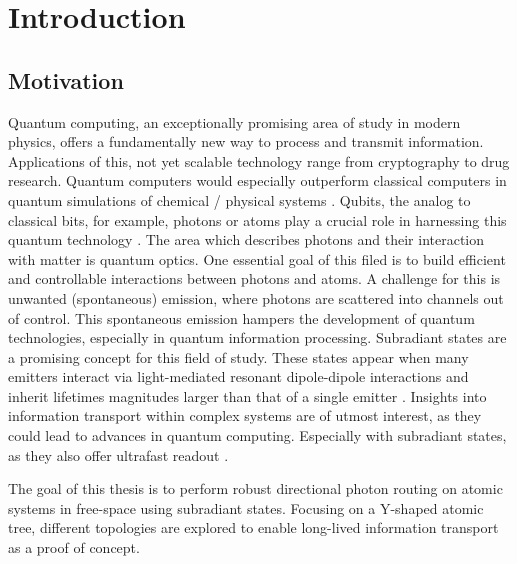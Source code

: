 \chapter{Introduction} %
\label{Chapter1} %

\section{Motivation}
\noindent
Quantum computing, an exceptionally promising area of study in modern physics, offers a fundamentally new way to process and transmit information.
Applications of this, not yet scalable technology range from cryptography to drug research.
Quantum computers would especially outperform classical computers in quantum simulations of chemical / physical systems \cite{Eddins2022}.
Qubits, the analog to classical bits, for example,
photons or atoms play a crucial role in harnessing this quantum technology \cite{Ramakrishnan2023}.
The area which describes photons and their interaction with matter is quantum optics.
One essential goal of this filed is to build efficient and controllable interactions between photons and atoms.
A challenge for this is unwanted (spontaneous) emission, where photons are scattered into channels out of control.
This spontaneous emission hampers the development of quantum technologies, especially in quantum information processing.
Subradiant states are a promising concept for this field of study.
These states appear when many emitters interact via light-mediated resonant dipole-dipole interactions
and inherit lifetimes magnitudes larger than that of a single emitter \cite{AsenjoGarcia2017}.
Insights into information transport within complex systems are of utmost interest,
as they could lead to advances in quantum computing. %
Especially with subradiant states, as they also offer ultrafast readout \cite{Scully2015}.

\vspace{0.5cm}
\noindent
The goal of this thesis is
to perform robust directional photon routing on atomic systems in free-space using subradiant states.
Focusing on a Y-shaped atomic tree, different topologies are explored to enable long-lived information transport as a proof of concept.

